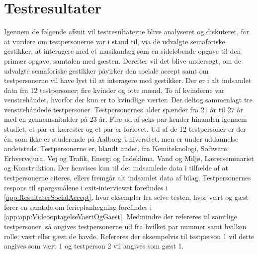 \chapter{Testresultater}
\label{TestresultaterSocialAccept}
%
Igennem de følgende afsnit vil testresultaterne blive analyseret og diskuteret, for at vurdere om testpersonerne var i stand til, via de udvalgte semaforiske gestikker, at interagere med et musikanlæg som en sideløbende opgave til den primær opgave; samtalen med gæsten. Derefter vil det blive undersøgt, om de udvalgte semaforiske gestikker påvirker den sociale accept samt om testpersonerne vil have lyst til at interagere med gestikker.\blankline
%
Der er i alt indsamlet data fra 12 testpersoner; fire kvinder og otte mænd. To af kvinderne var venstrehåndet, hvorfor der kun er to kvindlige værter. Der deltog sammenlagt tre venstrehåndede testpersoner. Testpersonernes alder spænder fra 21 år til 27 år med en gennemsnitalder på 23 år. Fire ud af seks par kender hinanden igennem studiet, et par er kærester og et par er forlovet. Ud af de 12 testpersoner er der én, som ikke er studerende på Aalborg Universitet, men er under uddannelse andetsteds. Testpersonerne er, blandt andet, fra Kemiteknologi, Software, Erhvervsjura, Vej og Trafik, Energi og Indeklima, Vand og Miljø, Lærerseminariet og Konstruktion. Der henvises kun til det indsamlede data i tilfælde af at testpersonerne citeres, ellers fremgår alt indsamlet data af bilag. Testpersonernes respons til spørgsmålene i exit-interviewet forefindes i \autoref{app:ResultaterSocialAccept}, hvor eksempler fra selve testen, hvor vært og gæst fører en samtale om ferieplanlægning forefindes i \autoref{app:app:VideooptagelseVaertOgGaest}. Medmindre der refereres til samtlige testpersoner, så angives testpersonerne ud fra hvilket par nummer samt hvilken rolle; vært eller gæst de havde. Refereres der eksempelvis til testperson 1 vil dette angives som vært 1 og testperson 2 vil angives som gæst 1. 



